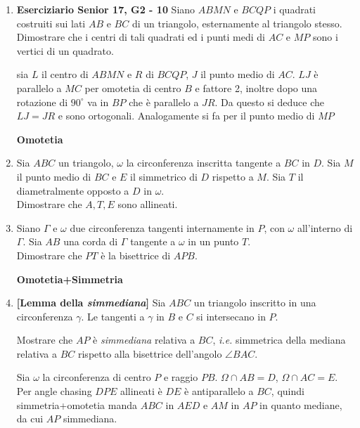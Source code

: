 \begin{enumerate}
      \item \textbf{Eserciziario Senior 17, G2 - 10} Siano $ABMN$ e $BCQP$ i quadrati costruiti sui lati $AB$ e $BC$ di un triangolo, esternamente al triangolo stesso.
      Dimostrare che i centri di tali quadrati ed i punti medi di $AC$ e $MP$ sono i vertici di un quadrato.
      
      \begin{sol}sia $L$ il centro di $ABMN$ e $R$ di $BCQP$, $J$ il punto medio di $AC$. $LJ$ è parallelo a $MC$ per omotetia di centro $B$ e fattore 2, inoltre dopo una rotazione di $90^{\circ}$ va in $BP$ che è parallelo a $JR$. Da questo si deduce che $LJ=JR$ e sono ortogonali. Analogamente si fa per il punto medio di $MP$
      \end{sol}
      
       \textbf{Omotetia}
       
       	\item Sia $ABC$ un triangolo, $\omega$ la circonferenza inscritta tangente a $BC$ in $D$. Sia $M$ il punto medio di $BC$ e $E$ il simmetrico di $D$ rispetto a $M$. Sia $T$ il diametralmente opposto a $D$ in $\omega$. \\
       	Dimostrare che $A,T,E$ sono allineati.
       	
       	\item Siano $\Gamma$ e $\omega$ due circonferenza tangenti internamente in $P$, con $\omega$ all'interno di $\Gamma$. Sia $AB$ una corda di $\Gamma$ tangente a $\omega$ in un punto $T$.\\
       	Dimostrare che $PT$ è la bisettrice di $APB$.
       	
       	
       
       \textbf{Omotetia+Simmetria}
       
       \item  \textbf{[Lemma della \textit{simmediana}]} Sia $ABC$ un triangolo inscritto in una circonferenza $\gamma$. Le tangenti a $\gamma$ in $B$ e $C$ si intersecano in $P$.
    
       Mostrare che $AP$ è \textit{simmediana} relativa a $BC$, \textit{i.e.} simmetrica della mediana relativa a $BC$ rispetto alla bisettrice dell'angolo $\angle BAC$.   
       
       \begin{sol}
       Sia $\omega$ la circonferenza di centro $P$ e raggio $PB$. $\Omega\cap AB=D$, $\Omega\cap AC=E$. Per angle chasing $DPE$ allineati è $DE$ è antiparallelo a $BC$, quindi simmetria+omotetia manda $ABC$ in $AED$ e $AM$ in $AP$ in quanto mediane, da cui $AP$ simmediana.
       \end{sol}


\end{enumerate}
